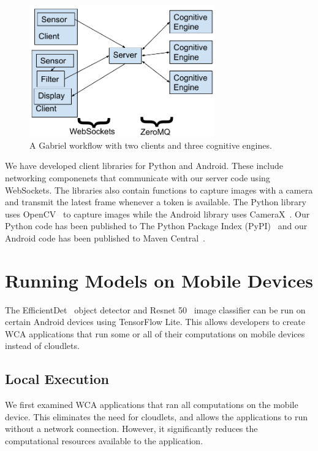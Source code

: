 \begin{figure}[h!]
  \includegraphics[width=8cm]{figures/runtime_architecture.pdf}
  \caption{A Gabriel workflow with two clients and three cognitive engines.
  }\label{fig:runtime_architecture}
\end{figure}

We have developed client libraries for Python and Android. These include
networking componenets that communicate with our server code using WebSockets.
The libraries also contain functions to capture images with a camera and
transmit the latest frame whenever a token is available. The Python library uses
OpenCV~\cite{opencv_library} to capture images while the Android library uses
CameraX~\cite{camerax}. Our Python code has been published to The Python Package
Index (PyPI)~\cite{gabriel_server, gabriel_python_client} and our Android code
has been published to Maven Central~\cite{gabriel_android_client}.

\section{Running Models on Mobile Devices}

The EfficientDet~\cite{Tan2020} object detector and Resnet 50~\cite{He2016}
image classifier can be run on certain Android devices using TensorFlow Lite.
This allows developers to create WCA applications that run some or all of their
computations on mobile devices instead of cloudlets.

\subsection{Local Execution}

We first examined WCA applications that ran all computations on the mobile
device.
This eliminates the need for cloudlets, and allows the applications to run
without a network connection.
However, it significantly reduces the computational resources available to the
application.

